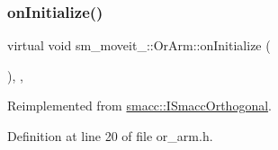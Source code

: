 \subsubsection{\texorpdfstring{on\+Initialize()}{onInitialize()}}
{\footnotesize\ttfamily virtual void sm\+\_\+moveit\+\_\+::\+Or\+Arm\+::on\+Initialize (\begin{DoxyParamCaption}{ }\end{DoxyParamCaption})\hspace{0.3cm}{\ttfamily [inline]}, {\ttfamily [override]}, {\ttfamily [virtual]}}



Reimplemented from \hyperlink{classsmacc_1_1ISmaccOrthogonal_a6bb31c620cb64dd7b8417f8705c79c7a}{smacc\+::\+I\+Smacc\+Orthogonal}.



Definition at line 20 of file or\+\_\+arm.\+h.


